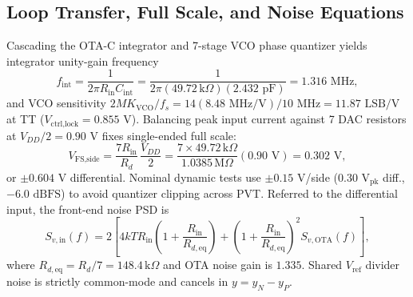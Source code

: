 \documentclass[10pt,twocolumn,letterpaper]{article}
\begin{document}
\subsection{Loop Transfer, Full Scale, and Noise Equations}
Cascading the OTA-C integrator and 7-stage VCO phase quantizer yields integrator unity-gain frequency
\begin{equation}
  f_{\text{int}} = \frac{1}{2\pi R_{\text{in}} C_{\text{int}}} = \frac{1}{2\pi (49.72\,\text{k}\Omega)(2.432\text{ pF})} = 1.316\text{ MHz},
\end{equation}
and VCO sensitivity $2M K_{\text{VCO}}/f_s=14(8.48\text{ MHz/V})/10\text{ MHz}=11.87\text{ LSB/V}$ at TT ($V_{\text{ctrl,lock}}=0.855\text{ V}$). Balancing peak input current against 7 DAC resistors at $V_{DD}/2=0.90\text{ V}$ fixes single-ended full scale:
\begin{equation}
  V_{\text{FS,side}} = \frac{7 R_{\text{in}}}{R_d}\,\frac{V_{DD}}{2} = \frac{7\times49.72\,\text{k}\Omega}{1.0385\,\text{M}\Omega}(0.90\text{ V}) = 0.302\text{ V},
\end{equation}
or $\pm0.604\text{ V}$ differential. Nominal dynamic tests use $\pm0.15\text{ V}$/side ($0.30\text{ V}_{\text{pk}}$ diff., $-6.0\text{ dBFS}$) to avoid quantizer clipping across PVT. Referred to the differential input, the front-end noise PSD is
\begin{equation}
  S_{v,\text{in}}(f) = 2\left[4kT R_{\text{in}}\!\left(1+\frac{R_{\text{in}}}{R_{d,\text{eq}}}\right) + \left(1+\frac{R_{\text{in}}}{R_{d,\text{eq}}}\right)^{\!2} S_{v,\text{OTA}}(f)\right],
\end{equation}
where $R_{d,\text{eq}}=R_d/7=148.4\,\text{k}\Omega$ and OTA noise gain is $1.335$. Shared $V_{\text{ref}}$ divider noise is strictly common-mode and cancels in $y=y_N-y_P$.
\end{document}
